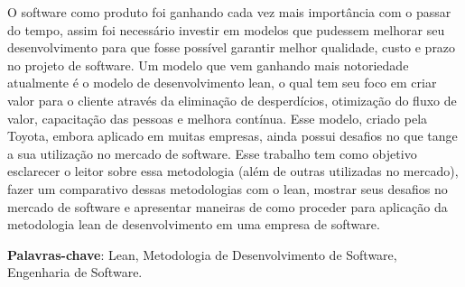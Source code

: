 


\setlength{\absparsep}{18pt} 
\begin{resumo}
O software como produto foi ganhando cada vez mais importância com o passar do tempo, assim foi necessário investir em modelos que pudessem melhorar seu desenvolvimento para que fosse possível garantir melhor qualidade, custo e prazo no projeto de software. Um modelo que vem ganhando mais notoriedade atualmente é o modelo de desenvolvimento lean, o qual tem seu foco em criar valor para o cliente através da eliminação de desperdícios, otimização do fluxo de valor, capacitação das pessoas e melhora contínua. Esse modelo, criado pela Toyota, embora aplicado em muitas empresas, ainda possui desafios no que tange a sua utilização no mercado de software. Esse trabalho tem como objetivo esclarecer o leitor sobre essa metodologia (além de outras utilizadas no mercado), fazer um comparativo dessas metodologias com o lean, mostrar seus desafios no mercado de software e apresentar maneiras de como proceder para aplicação da metodologia lean de desenvolvimento em uma empresa de software.

\textbf{Palavras-chave}: Lean, Metodologia de Desenvolvimento de Software, Engenharia de Software. %

\end{resumo}
 
